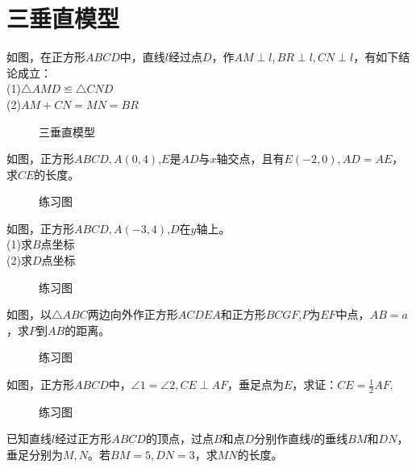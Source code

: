 \section{三垂直模型}
\begin{definition}
    如图，在正方形$ABCD$中，直线$l$经过点$D$，作$AM\perp l,BR\perp l,CN\perp l$，有如下结论成立：\\
    (1)$\triangle AMD \backcong \triangle CND$ \\
    (2)$AM+CN=MN=BR$ \\
\end{definition}
\begin{figure}[H]
    \centering
    \resizebox{4cm}{!}{}
    \caption{三垂直模型}
\end{figure}
\begin{problem}
如图，正方形$ABCD,A(0,4)$,$E$是$AD$与$x$轴交点，且有$E(-2,0),AD=AE$，求$CE$的长度。
\end{problem}
\begin{figure}[H]
    \centering
    \resizebox{3cm}{!}{}
    \caption{练习图}
\end{figure}
\begin{problem}
如图，正方形$ABCD,A(-3,4)$,$D$在$y$轴上。\\
(1)求$B$点坐标 \\
(2)求$D$点坐标 \\
\end{problem}
\begin{figure}[H]
    \centering
    \resizebox{3cm}{!}{}
    \caption{练习图}
\end{figure}
\begin{problem}
如图，以$\triangle ABC$两边向外作正方形$ACDEA$和正方形$BCGF$,$P$为$EF$中点，$AB=a$，求$P$到$AB$的距离。\\
\end{problem}
\begin{figure}[H]
    \centering
    \resizebox{4cm}{!}{}
    \caption{练习图}
\end{figure}
\begin{problem}
如图，正方形$ABCD$中，$\angle 1=\angle 2,CE\perp AF$，垂足点为$E$，求证：$CE=\frac{1}{2}AF$.
\end{problem}
\begin{figure}[H]
    \centering
    \resizebox{4cm}{!}{}
    \caption{练习图}
\end{figure}
\begin{problem}
已知直线$l$经过正方形$ABCD$的顶点，过点$B$和点$D$分别作直线$l$的垂线$BM$和$DN$，垂足分别为$M,N$。若$BM=5,DN=3$，求$MN$的长度。
\end{problem}
\clearpage
